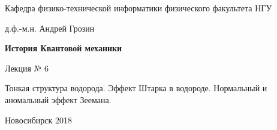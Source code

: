 \documentclass[12pt,pagesize,paper=landscape,paper=192mm:108mm]{scrbook}
\begin{document}
\begin{titlepage}
\begin{center}
    Кафедра физико-технической информатики физического факультета НГУ
    \medskip

    \Large
    д.ф.-м.н. Андрей Грозин
    
    \bigskip

    \huge
    \textbf{История Квантовой механики}
    \bigskip

    \Large
    Лекция № 6
    \vfill

    \normalsize
    \begin{minipage}{0.55\linewidth}
      Тонкая структура водорода. Эффект Штарка в водороде. Нормальный
      и аномальный эффект Зеемана.
    \end{minipage}
    \vfill

    \normalsize \ccbysa\hspace{0.5em}  Новосибирск 2018
  \end{center}
\end{titlepage}
\end{document}
